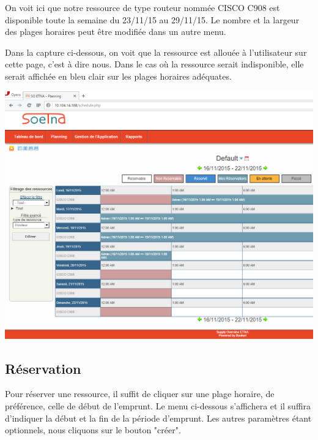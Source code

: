 \documentclass[a4paper,11pt]{article}
\begin{document}
\vspace{1 cm}

On voit ici que notre ressource de type routeur nommée CISCO C908 est disponible toute la semaine du 23/11/15 au 29/11/15.
Le nombre et la largeur des plages horaires peut être modifiée dans un autre menu.

\newpage

Dans la capture ci-dessous, on voit que la ressource est allouée à l'utilisateur sur cette page, c'est à dire nous. Dans le cas où la ressource serait indisponible, elle serait affichée en bleu clair sur
les plages horaires adéquates.

\vspace{1 cm}

\includegraphics[width=15cm]{./resa3.PNG}

\newpage

\subsection{Réservation}

Pour réserver une ressource, il suffit de cliquer sur une plage horaire, de préférence, celle de début de l'emprunt.
Le menu ci-dessous s'affichera et il suffira d'indiquer la début et la fin de 
la période d'emprunt. Les autres paramètres étant optionnels, nous cliquons sur le bouton "créer".
\end{document}
